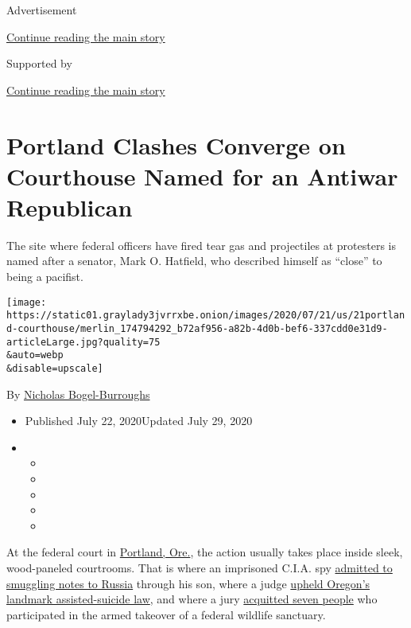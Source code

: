Advertisement

\protect\hyperlink{after-top}{Continue reading the main story}

Supported by

\protect\hyperlink{after-sponsor}{Continue reading the main story}

\hypertarget{portland-clashes-converge-on-courthouse-named-for-an-antiwar-republican}{%
\section{Portland Clashes Converge on Courthouse Named for an Antiwar
Republican}\label{portland-clashes-converge-on-courthouse-named-for-an-antiwar-republican}}

The site where federal officers have fired tear gas and projectiles at
protesters is named after a senator, Mark O. Hatfield, who described
himself as ``close'' to being a pacifist.

\texttt{[image: https://static01.graylady3jvrrxbe.onion/images/2020/07/21/us/21portland-courthouse/merlin\_174794292\_b72af956-a82b-4d0b-bef6-337cdd0e31d9-articleLarge.jpg?quality=75\\\&auto=webp\\\&disable=upscale]}

By
\href{https://www.nytimes3xbfgragh.onion/by/nicholas-bogel-burroughs}{Nicholas
Bogel-Burroughs}

\begin{itemize}
\item
  Published July 22, 2020Updated July 29, 2020
\item
  \begin{itemize}
  \item
  \item
  \item
  \item
  \item
  \end{itemize}
\end{itemize}

At the federal court in
\href{https://www.nytimes3xbfgragh.onion/interactive/2020/07/22/us/portland-protests.html}{Portland,
Ore.}, the action usually takes place inside sleek, wood-paneled
courtrooms. That is where an imprisoned C.I.A. spy
\href{https://www.oregonlive.com/portland/2010/11/former_cia_spy_jim_nicholson_p_1.html}{admitted
to smuggling notes to Russia} through his son, where a judge
\href{https://www.cnn.com/2002/LAW/04/17/oregon.assisted.suicide/}{upheld
Oregon's landmark assisted-suicide law}, and where a jury
\href{https://www.nytimes3xbfgragh.onion/2016/10/28/us/bundy-brothers-acquitted-in-takeover-of-oregon-wildlife-refuge.html}{acquitted
seven people} who participated in the armed takeover of a federal
wildlife sanctuary.

